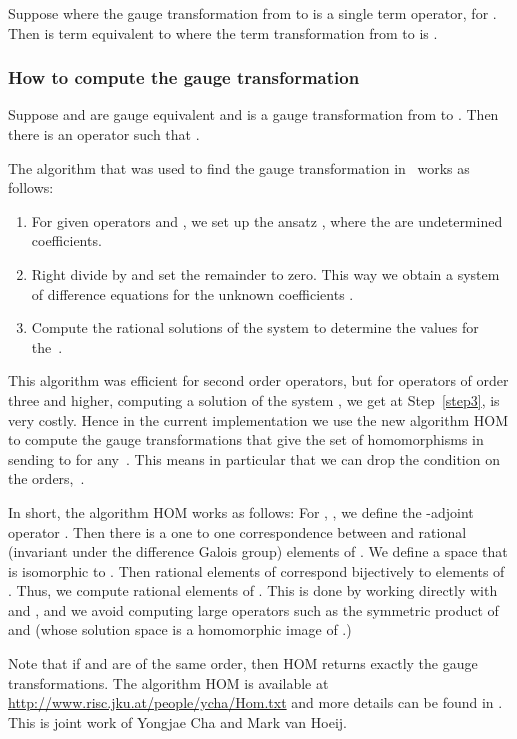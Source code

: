 \documentclass{article}
\begin{document}
Suppose  where the gauge transformation from  to  is a single term operator,  for . 
Then  is term equivalent to  where the term transformation from  to  is .



\subsubsection{How to compute the gauge transformation}\label{hom}
Suppose  and  are gauge equivalent and  is a gauge transformation from 
to .  Then there is an operator  such that .

The algorithm that was used to find the gauge transformation in~\cite{CH09, CHG10, GH10}
works as follows:
\begin{enumerate}
\item For given operators  and , we set up the ansatz
  , where the  are undetermined
  coefficients.
\item\label{step3} Right divide  by  and set the remainder to zero. This way we obtain a
  system  of difference equations for the unknown coefficients .
\item  Compute the  rational  solutions of the  system    to determine  the  values for
  the~.
\end{enumerate}

This algorithm was efficient for second order operators, but for operators
  of order three and higher, computing a solution of the system , we get at
  Step~\ref{step3}, is very costly. Hence in the current implementation we use the new
algorithm HOM to compute the gauge transformations that give the set of homomorphisms
 in~ sending  to  for any~. This
means in particular that we can drop the condition on the orders,~.

In short, the algorithm HOM works as follows: For ,
, we define the -adjoint operator .  Then there is a one to one correspondence between 
and rational (invariant under the difference Galois group) elements of .  We define a space  that is isomorphic to
.  Then rational elements of 
correspond bijectively to elements of . Thus, we compute rational elements
of .  This is done by working directly with  and
, and we avoid computing large operators such as the symmetric product of 
and  (whose solution space is a homomorphic image of .)

Note that if  and  are of the same order, then HOM returns exactly the gauge
transformations. The algorithm HOM is available at
\url{http://www.risc.jku.at/people/ycha/Hom.txt} and more details can be found in \cite{TensorRatSol}. This is joint work of Yongjae Cha and Mark van Hoeij.
\end{document}
